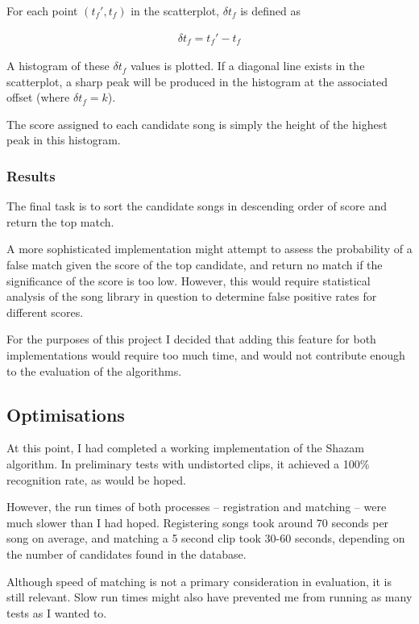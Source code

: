 \documentclass[12pt,a4paper,twoside,openright]{report}
\begin{document}
For each point $(t_f',t_f)$ in the scatterplot, $\delta t_f$ is defined as

\begin{align*}
  \delta t_f = t_f' - t_f
\end{align*}

A histogram of these $\delta t_f$ values is plotted. If a diagonal line exists in the scatterplot, a sharp peak will be produced in the histogram at the associated offset (where $\delta t_f = k$).

The score assigned to each candidate song is simply the height of the highest peak in this histogram.


\subsubsection{Results}

The final task is to sort the candidate songs in descending order of score and return the top match. 

A more sophisticated implementation might attempt to assess the probability of a false match given the score of the top candidate, and return no match if the significance of the score is too low. However, this would require statistical analysis of the song library in question to determine false positive rates for different scores.

For the purposes of this project I decided that adding this feature for both implementations would require too much time, and would not contribute enough to the evaluation of the algorithms.


\subsection{Optimisations}
\label{section:shazamoptimisations}

At this point, I had completed a working implementation of the Shazam algorithm. In preliminary tests with undistorted clips, it achieved a 100\% recognition rate, as would be hoped.

However, the run times of both processes -- registration and matching -- were much slower than I had hoped. Registering songs took around 70 seconds per song on average, and matching a 5 second clip took 30-60 seconds, depending on the number of candidates found in the database.

Although speed of matching is not a primary consideration in evaluation, it is still relevant. Slow run times might also have prevented me from running as many tests as I wanted to. 
\end{document}
